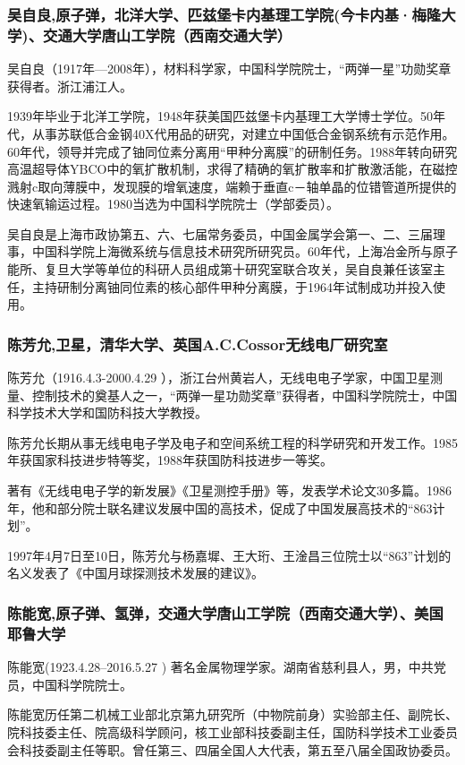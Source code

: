 \documentclass[UTF8]{ctexart}
\begin{document}
    \subsubsection{吴自良,原子弹，北洋大学、匹兹堡卡内基理工学院(今卡内基·梅隆大学)、交通大学唐山工学院（西南交通大学）}
吴自良（1917年—2008年），材料科学家，中国科学院院士，“两弹一星”功勋奖章获得者。浙江浦江人。

1939年毕业于北洋工学院，1948年获美国匹兹堡卡内基理工大学博士学位。50年代，从事苏联低合金钢40X代用品的研究，对建立中国低合金钢系统有示范作用。60年代，领导并完成了铀同位素分离用“甲种分离膜”的研制任务。1988年转向研究高温超导体YBCO中的氧扩散机制，求得了精确的氧扩散率和扩散激活能，在磁控溅射c取向薄膜中，发现膜的增氧速度，端赖于垂直c－轴单晶的位错管道所提供的快速氧输运过程。1980当选为中国科学院院士（学部委员）。

吴自良是上海市政协第五、六、七届常务委员，中国金属学会第一、二、三届理事，中国科学院上海微系统与信息技术研究所研究员。60年代，上海冶金所与原子能所、复旦大学等单位的科研人员组成第十研究室联合攻关，吴自良兼任该室主任，主持研制分离铀同位素的核心部件甲种分离膜，于1964年试制成功并投入使用。

    \subsubsection{陈芳允,卫星，清华大学、英国A.C.Cossor无线电厂研究室}
陈芳允（1916.4.3-2000.4.29 ），浙江台州黄岩人，无线电电子学家，中国卫星测量、控制技术的奠基人之一，“两弹一星功勋奖章”获得者，中国科学院院士，中国科学技术大学和国防科技大学教授。

陈芳允长期从事无线电电子学及电子和空间系统工程的科学研究和开发工作。1985年获国家科技进步特等奖，1988年获国防科技进步一等奖。

著有《无线电电子学的新发展》《卫星测控手册》等，发表学术论文30多篇。1986年，他和部分院士联名建议发展中国的高技术，促成了中国发展高技术的“863计划”。

1997年4月7日至10日，陈芳允与杨嘉墀、王大珩、王淦昌三位院士以“863”计划的名义发表了《中国月球探测技术发展的建议》。

    \subsubsection{陈能宽,原子弹、氢弹，交通大学唐山工学院（西南交通大学）、美国耶鲁大学}
陈能宽(1923.4.28--2016.5.27 ) 著名金属物理学家。湖南省慈利县人，男，中共党员，中国科学院院士。

陈能宽历任第二机械工业部北京第九研究所（中物院前身）实验部主任、副院长、院科技委主任、院高级科学顾问，核工业部科技委副主任，国防科学技术工业委员会科技委副主任等职。曾任第三、四届全国人大代表，第五至八届全国政协委员。 
\end{document}
